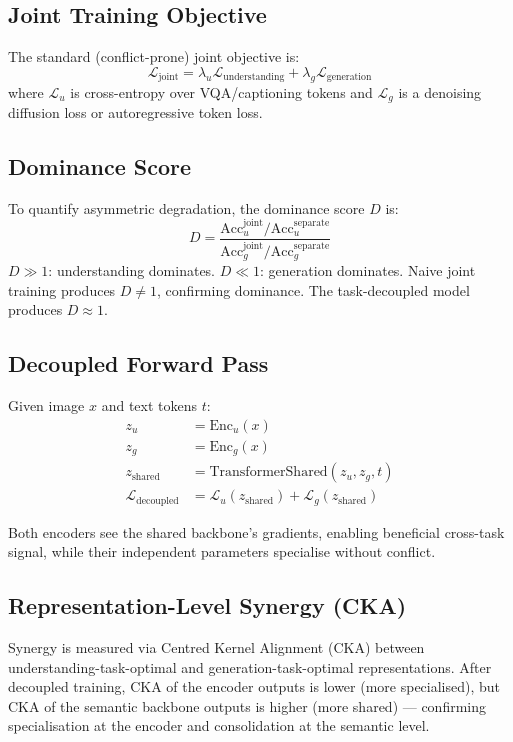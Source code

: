 \documentclass[10pt,twocolumn]{article}
\begin{document}
\subsection{Joint Training Objective}

The standard (conflict-prone) joint objective is:
\[
  \mathcal{L}_\mathrm{joint}
    = \lambda_u \mathcal{L}_\mathrm{understanding}
    + \lambda_g \mathcal{L}_\mathrm{generation}
\]
where $\mathcal{L}_u$ is cross-entropy over VQA/captioning tokens and
$\mathcal{L}_g$ is a denoising diffusion loss or autoregressive token loss.

\subsection{Dominance Score}

To quantify asymmetric degradation, the dominance score $D$ is:
\[
  D = \frac{\mathrm{Acc}_u^\mathrm{joint} / \mathrm{Acc}_u^\mathrm{separate}}
           {\mathrm{Acc}_g^\mathrm{joint} / \mathrm{Acc}_g^\mathrm{separate}}
\]
$D \gg 1$: understanding dominates. $D \ll 1$: generation dominates.
Naive joint training produces $D \neq 1$, confirming dominance. The
task-decoupled model produces $D \approx 1$.

\subsection{Decoupled Forward Pass}

Given image $x$ and text tokens $t$:
\begin{align}
  z_u &= \mathrm{Enc}_u(x) \\
  z_g &= \mathrm{Enc}_g(x) \\
  z_\mathrm{shared} &= \mathrm{TransformerShared}(z_u, z_g, t) \\
  \mathcal{L}_\mathrm{decoupled} &= \mathcal{L}_u(z_\mathrm{shared})
    + \mathcal{L}_g(z_\mathrm{shared})
\end{align}

Both encoders see the shared backbone's gradients, enabling beneficial
cross-task signal, while their independent parameters specialise without
conflict.

\subsection{Representation-Level Synergy (CKA)}

Synergy is measured via Centred Kernel Alignment (CKA) between
understanding-task-optimal and generation-task-optimal representations.
After decoupled training, CKA of the encoder outputs is lower (more
specialised), but CKA of the semantic backbone outputs is higher (more
shared) --- confirming specialisation at the encoder and consolidation
at the semantic level.
\end{document}
